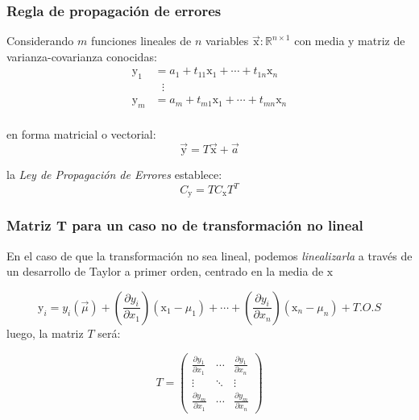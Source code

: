 \documentclass[openany]{book}
\begin{document}
\subsubsection{Regla de propagación de errores}
Considerando $m$ funciones lineales de $n$ variables $\vec{\mathrm{x}}: \mathbb{R}^{n\times1}$ con media y matriz de varianza-covarianza conocidas:
\begin{align*}
  \mathrm{y}_1&=a_{1}+t_{11}\mathrm{x}_{1}+\cdots+t_{1n}\mathrm{x}_{n}\\
  &\,\,\,\,\vdots\\
  \mathrm{y}_m&=a_{m}+t_{m1}\mathrm{x}_{1}+\cdots+t_{mn}\mathrm{x}_{n}\\
\end{align*}

en forma matricial o vectorial:
\begin{equation*}
  \vec{\mathrm{y}}=T\vec{\mathrm{x}}+\vec{a}
\end{equation*}

la \emph{Ley de Propagación de Errores} establece:
\begin{equation}
  \label{eq:prop-errores}
  C_{\mathrm{y}}=TC_{\mathrm{x}}T^{T}
\end{equation}

\subsubsection{Matriz T para un caso no de transformación no lineal}
En el caso de que la transformación no sea lineal, podemos \emph{linealizarla} a través de un desarrollo de Taylor a primer orden, centrado en la media de $\mathrm{x}$

\begin{equation*}
  \mathrm{y}_{i}=y_{i}(\vec{\mu})+\left(\frac{\partial y_{i}}{\partial x_{1}}\right)(\mathrm{x}_{1}-\mu_{1})+\cdots+\left(\frac{\partial y_{i}}{\partial x_{n}}\right)(\mathrm{x}_{n}-\mu_{n})+T.O.S
\end{equation*}
luego, la matriz $T$ será:

\begin{equation*}
  T=\left(\begin{matrix}\frac{\partial y_{1}}{\partial x_{1}} & \cdots & \frac{\partial y_{1}}{\partial x_{n}}\\
    \vdots & \ddots & \vdots\\
    \frac{\partial y_{m}}{\partial x_{1}} & \cdots & \frac{\partial y_{m}}{\partial x_{n}}\end{matrix}\right)
\end{equation*}
\end{document}
